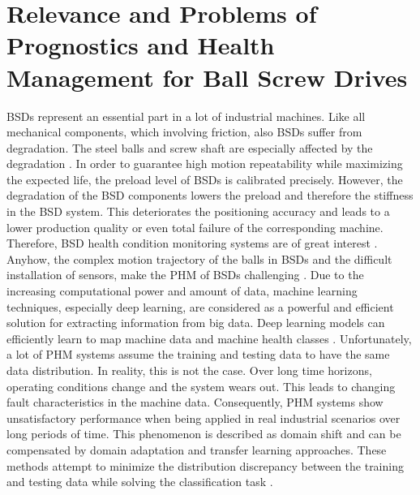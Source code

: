 \section{Relevance and Problems of Prognostics and Health Management for Ball Screw Drives}
BSDs represent an essential part in a lot of industrial machines. Like all mechanical components, which involving friction, also BSDs suffer from degradation. The steel balls and screw shaft are especially affected by the degradation \cite{Pandhare2021}. In order to guarantee high motion repeatability while maximizing the expected life, the preload level of BSDs is calibrated precisely. However, the degradation of the BSD components lowers the preload and therefore the stiffness in the BSD system. This deteriorates the positioning accuracy and leads to a lower production quality or even total failure of the corresponding machine. Therefore, BSD health condition monitoring systems are of great interest \cite{Pandhare2021}. Anyhow, the complex motion trajectory of the balls in BSDs and the difficult installation of sensors, make the PHM of BSDs challenging \cite{LiPin2018}. Due to the increasing computational power and amount of data, machine learning techniques, especially deep learning, are considered as a powerful and efficient solution for extracting information from big data. Deep learning models can efficiently learn to map machine data and machine health classes \cite{ZHAO2019213}. Unfortunately, a lot of PHM systems assume the training and testing data to have the same data distribution. In reality, this is not the case. Over long time horizons, operating conditions change and the system wears out. This leads to changing fault characteristics in the machine data. Consequently, PHM systems show unsatisfactory performance when being applied in real industrial scenarios over long periods of time. This phenomenon is described as domain shift and can be compensated by domain adaptation and transfer learning approaches. These methods attempt to minimize the distribution discrepancy between the training and testing data while solving the classification task \cite{AZAMFAR2020103932}.


